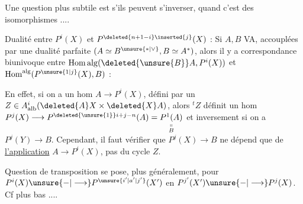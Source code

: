Une question plus subtile est s'ils peuvent
s'inverser, quand c'est des isomorphismes ....

Dualité entre $P^i(X)$ et $P^{\deleted{n+1-i}\inserted{j}}(X)$  : Si $A,B$
  VA,  accouplées
par une dualité parfaite $(A\simeq B^{\unsure{*|\vee}}, B\simeq A^*)$,
alors il y a correspondance biunivoque
entre $\operatorname{Hom\,alg}(\deleted{\unsure{B}}A,P^i(X))$ et $\operatorname{Hom}^{\mathrm{alg}}(P^{\unsure{1|j}}(X),B)$ :

En effet, si on a un hom
$A\longrightarrow P^i(X)$, défini par un $Z\in A^i_{\mathrm{alb}}(\deleted{A}X\times\deleted{X}A)$,
alors $ {}^t Z$ définit un hom $P^j(X)\longrightarrow P^{\deleted{\unsure{1}}i+j-n}(A)=\underset{\substack{\shortparallel\\B}}{P^1(A)}$
et inversement si on a $P^j(Y)\longrightarrow B$. 
Cependant, \margin{$\big|\big|\big|$}il faut vérifier que $P^j(X)\longrightarrow B$ ne dépend que
de \uline{l'application} $A\longrightarrow P^i(X)$, pas du cycle $Z$.

Question de transposition se pose, plus généralement, pour
$P^i(X)\unsure{-|\longrightarrow}P^{\unsure{i'|a'|j'}}(X')$ en $P^{j'}(X')\unsure{-|\longrightarrow}P^j(X)$.
Cf plus bas ....
